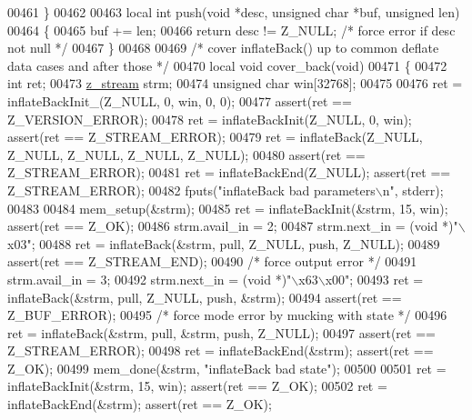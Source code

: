\begin{DoxyCode}
{{{{{00461 \}
00462 
00463 local \textcolor{keywordtype}{int} push(\textcolor{keywordtype}{void} *desc, \textcolor{keywordtype}{unsigned} \textcolor{keywordtype}{char} *buf, \textcolor{keywordtype}{unsigned} len)
00464 \{
00465     buf += len;
00466     \textcolor{keywordflow}{return} desc != Z\_NULL;      \textcolor{comment}{/* force error if desc not null */}
00467 \}
00468 
00469 \textcolor{comment}{/* cover inflateBack() up to common deflate data cases and after those */}
00470 local \textcolor{keywordtype}{void} cover\_back(\textcolor{keywordtype}{void})
00471 \{
00472     \textcolor{keywordtype}{int} ret;
00473     \hyperlink{structz__stream__s}{z\_stream} strm;
00474     \textcolor{keywordtype}{unsigned} \textcolor{keywordtype}{char} win[32768];
00475 
00476     ret = inflateBackInit\_(Z\_NULL, 0, win, 0, 0);
00477                                                 assert(ret == Z\_VERSION\_ERROR);
00478     ret = inflateBackInit(Z\_NULL, 0, win);      assert(ret == Z\_STREAM\_ERROR);
00479     ret = inflateBack(Z\_NULL, Z\_NULL, Z\_NULL, Z\_NULL, Z\_NULL);
00480                                                 assert(ret == Z\_STREAM\_ERROR);
00481     ret = inflateBackEnd(Z\_NULL);               assert(ret == Z\_STREAM\_ERROR);
00482     fputs(\textcolor{stringliteral}{"inflateBack bad parameters\(\backslash\)n"}, stderr);
00483 
00484     mem\_setup(&strm);
00485     ret = inflateBackInit(&strm, 15, win);      assert(ret == Z\_OK);
00486     strm.avail\_in = 2;
00487     strm.next\_in = (\textcolor{keywordtype}{void} *)\textcolor{stringliteral}{"\(\backslash\)x03"};
00488     ret = inflateBack(&strm, pull, Z\_NULL, push, Z\_NULL);
00489                                                 assert(ret == Z\_STREAM\_END);
00490         \textcolor{comment}{/* force output error */}
00491     strm.avail\_in = 3;
00492     strm.next\_in = (\textcolor{keywordtype}{void} *)\textcolor{stringliteral}{"\(\backslash\)x63\(\backslash\)x00"};
00493     ret = inflateBack(&strm, pull, Z\_NULL, push, &strm);
00494                                                 assert(ret == Z\_BUF\_ERROR);
00495         \textcolor{comment}{/* force mode error by mucking with state */}
00496     ret = inflateBack(&strm, pull, &strm, push, Z\_NULL);
00497                                                 assert(ret == Z\_STREAM\_ERROR);
00498     ret = inflateBackEnd(&strm);                assert(ret == Z\_OK);
00499     mem\_done(&strm, \textcolor{stringliteral}{"inflateBack bad state"});
00500 
00501     ret = inflateBackInit(&strm, 15, win);      assert(ret == Z\_OK);
00502     ret = inflateBackEnd(&strm);                assert(ret == Z\_OK);
}}}}}
\end{DoxyCode}
